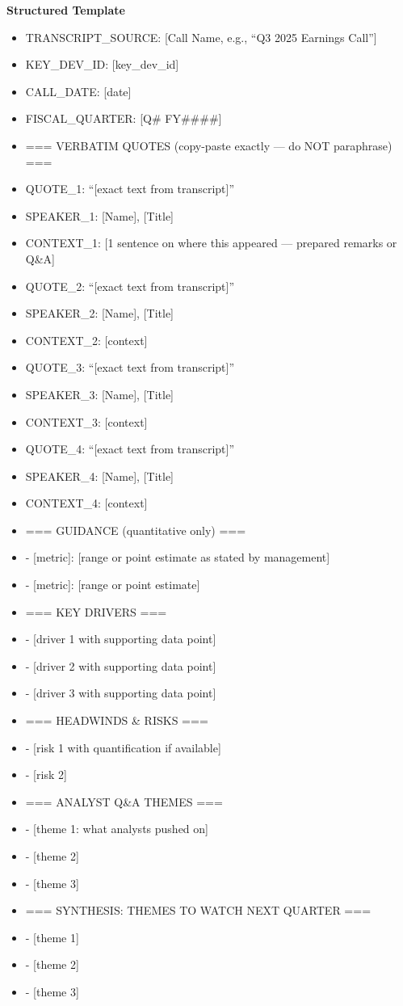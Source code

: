 \documentclass[11pt]{article}
\begin{document}
\textbf{Structured Template}
\begin{itemize}[leftmargin=*,itemsep=2pt,topsep=2pt]
\item {} TRANSCRIPT\_\allowbreak{}SOURCE: [Call Name, e.g., ``Q3 2025 Earnings Call'']
\item {} KEY\_\allowbreak{}DEV\_\allowbreak{}ID: [key\_\allowbreak{}dev\_\allowbreak{}id]
\item {} CALL\_\allowbreak{}DATE: [date]
\item {} FISCAL\_\allowbreak{}QUARTER: [Q\# FY\#\#\#\#]
\item {} === VERBATIM QUOTES (copy-paste exactly — do NOT paraphrase) ===
\item {} QUOTE\_\allowbreak{}1: ``[exact text from transcript]''
\item {} SPEAKER\_\allowbreak{}1: [Name], [Title]
\item {} CONTEXT\_\allowbreak{}1: [1 sentence on where this appeared — prepared remarks or Q\&A]
\item {} QUOTE\_\allowbreak{}2: ``[exact text from transcript]''
\item {} SPEAKER\_\allowbreak{}2: [Name], [Title]
\item {} CONTEXT\_\allowbreak{}2: [context]
\item {} QUOTE\_\allowbreak{}3: ``[exact text from transcript]''
\item {} SPEAKER\_\allowbreak{}3: [Name], [Title]
\item {} CONTEXT\_\allowbreak{}3: [context]
\item {} QUOTE\_\allowbreak{}4: ``[exact text from transcript]''
\item {} SPEAKER\_\allowbreak{}4: [Name], [Title]
\item {} CONTEXT\_\allowbreak{}4: [context]
\item {} === GUIDANCE (quantitative only) ===
\item {} - [metric]: [range or point estimate as stated by management]
\item {} - [metric]: [range or point estimate]
\item {} === KEY DRIVERS ===
\item {} - [driver 1 with supporting data point]
\item {} - [driver 2 with supporting data point]
\item {} - [driver 3 with supporting data point]
\item {} === HEADWINDS \& RISKS ===
\item {} - [risk 1 with quantification if available]
\item {} - [risk 2]
\item {} === ANALYST Q\&A THEMES ===
\item {} - [theme 1: what analysts pushed on]
\item {} - [theme 2]
\item {} - [theme 3]
\item {} === SYNTHESIS: THEMES TO WATCH NEXT QUARTER ===
\item {} - [theme 1]
\item {} - [theme 2]
\item {} - [theme 3]
\end{itemize}
\end{document}
